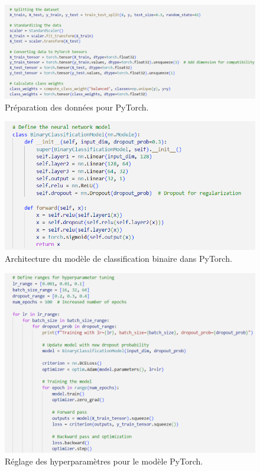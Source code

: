\begin{figure}[H]
    \centering
    \includegraphics[width=0.9\linewidth]{capture_sas_73.png}
    \caption{Préparation des données pour PyTorch.}
    \label{pytorch_code}
\end{figure}
\vspace{10pt}

\begin{figure}[H]
    \centering
    \includegraphics[width=0.8\linewidth]{capture_sas_74.png}
    \caption{Architecture du modèle de classification binaire dans PyTorch.}
    \label{model_architecture}
\end{figure}
\vspace{10pt}

\begin{figure}[H]
    \centering
    \includegraphics[width=0.8\linewidth]{capture_sas_75.png}
    \caption{Réglage des hyperparamètres pour le modèle PyTorch.}
    \label{fig_hyperparam_code}
\end{figure}
\vspace{10pt}

